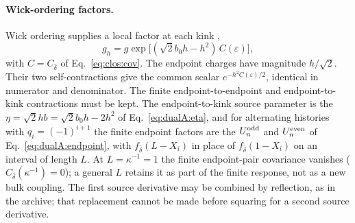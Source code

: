 \documentclass[11pt,a4paper]{article}
\numberwithin{equation}{section}
\newcommand{\db}{\bar\delta}
\begin{document}
\paragraph{Wick-ordering factors.} Wick ordering supplies a local factor at each kink
\cite[Eqs.~(3.20)--(3.23)]{Benedetti:2025nzp},
\begin{equation}
 g_h=g\exp\bigl[(\sqrt2b_0h-h^2)\,C(\varepsilon)\bigr],
 \label{eq:clos:gh}
\end{equation}
with $C=C_{\db}$ of Eq.~\eqref{eq:clos:cov}. The endpoint charges have magnitude $h/\sqrt2$. Their two self-contractions
give the common scalar $e^{-h^2C(\varepsilon)/2}$, identical in numerator and denominator. The finite endpoint-to-endpoint
and endpoint-to-kink contractions must be kept. The endpoint-to-kink source parameter is the $\eta=\sqrt2hb
=\sqrt2b_0h-2h^2$ of Eq.~\eqref{eq:dualA:eta}, and for alternating histories with $q_i=(-1)^{i+1}$ the finite endpoint
factors are the $U_n^{\rm odd}$ and $U_n^{\rm even}$ of Eq.~\eqref{eq:dualA:endpoint}, with $f_{\db}(L-X_i)$ in place of
$f_{\db}(1-X_i)$ on an interval of length $L$. At
$L=\kappa^{-1}=1$ the finite endpoint-pair covariance vanishes ($C_{\db}(\kappa^{-1})=0$); a general $L$ retains it as
part of the finite response, not as a new bulk coupling. The first source derivative may be combined by reflection, as
in the archive; that replacement cannot be made before squaring for a second source derivative.
\end{document}
